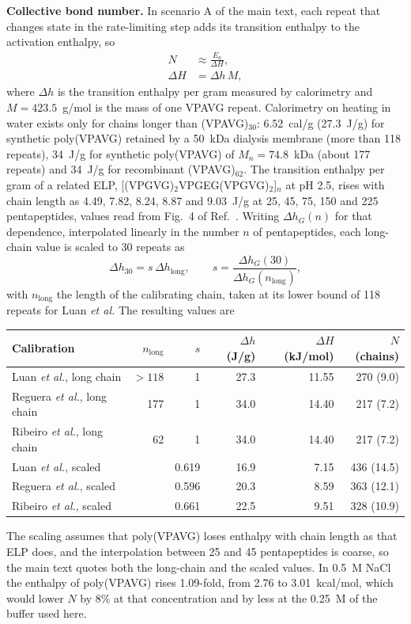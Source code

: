 \documentclass[11pt]{article}
\newcommand{\VPAVG}{(VPAVG)$_{30}$}
\begin{document}
\textbf{Collective bond number.} In scenario A of the main text, each repeat that changes state in the rate-limiting step adds its transition enthalpy to the activation enthalpy, so
\begin{align}
 N&\approx\frac{E_a}{\Delta H},\label{eq:si-n}\\
 \Delta H&=\Delta h\,M,\label{eq:si-dhrepeat}
\end{align}
where $\Delta h$ is the transition enthalpy per gram measured by calorimetry and $M=423.5$~g/mol is the mass of one VPAVG repeat. Calorimetry on heating in water exists only for chains longer than \VPAVG: 6.52~cal/g (27.3~J/g) for synthetic poly(VPAVG) retained by a 50~kDa dialysis membrane (more than 118 repeats),\cite{Luan1991-bp} 34~J/g for synthetic poly(VPAVG) of $M_n=74.8$~kDa (about 177 repeats)\cite{Reguera2003-ma} and 34~J/g for recombinant (VPAVG)$_{62}$.\cite{Ribeiro2009-bj} The transition enthalpy per gram of a related ELP, [(VPGVG)$_2$VPGEG(VPGVG)$_2$]$_n$ at pH 2.5, rises with chain length as 4.49, 7.82, 8.24, 8.87 and 9.03~J/g at 25, 45, 75, 150 and 225 pentapeptides, values read from Fig.~4 of Ref.~. Writing $\Delta h_G(n)$ for that dependence, interpolated linearly in the number $n$ of pentapeptides, each long-chain value is scaled to 30 repeats as
\begin{equation}
 \Delta h_{30}=s\,\Delta h_\mathrm{long},\qquad s=\frac{\Delta h_G(30)}{\Delta h_G(n_\mathrm{long})},
 \label{eq:si-scale}
\end{equation}
with $n_\mathrm{long}$ the length of the calibrating chain, taken at its lower bound of 118 repeats for Luan \textit{et al.} The resulting values are
\begin{center}
\begin{tabular}{lrrrrr}
\hline
Calibration & $n_\mathrm{long}$ & $s$ & $\Delta h$ (J/g) & $\Delta H$ (kJ/mol) & $N$ (chains) \\
\hline
Luan \textit{et al.}, long chain & $>118$ & 1 & 27.3 & 11.55 & 270 (9.0) \\
Reguera \textit{et al.}, long chain & 177 & 1 & 34.0 & 14.40 & 217 (7.2) \\
Ribeiro \textit{et al.}, long chain & 62 & 1 & 34.0 & 14.40 & 217 (7.2) \\
Luan \textit{et al.}, scaled & & 0.619 & 16.9 & 7.15 & 436 (14.5) \\
Reguera \textit{et al.}, scaled & & 0.596 & 20.3 & 8.59 & 363 (12.1) \\
Ribeiro \textit{et al.}, scaled & & 0.661 & 22.5 & 9.51 & 328 (10.9) \\
\hline
\end{tabular}
\end{center}
The scaling assumes that poly(VPAVG) loses enthalpy with chain length as that ELP does, and the interpolation between 25 and 45 pentapeptides is coarse, so the main text quotes both the long-chain and the scaled values. In 0.5~M NaCl the enthalpy of poly(VPAVG) rises 1.09-fold, from 2.76 to 3.01~kcal/mol,\cite{Luan1991-bp} which would lower $N$ by 8\% at that concentration and by less at the 0.25~M of the buffer used here.
\end{document}

